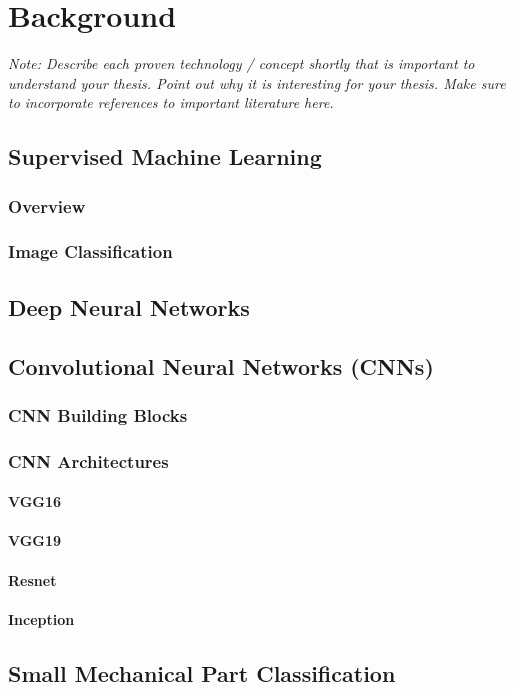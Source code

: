 
\chapter{Background}

\textit{Note: Describe each proven technology / concept shortly that is important to understand your thesis. Point out why it is interesting for your thesis. Make sure to incorporate references to important literature here.}

\section{Supervised Machine Learning}
\subsection{Overview}
\subsection{Image Classification}

\section{Deep Neural Networks}

\section{Convolutional Neural Networks (CNNs)}
\subsection{CNN Building Blocks}
\subsection{CNN Architectures}
\subsubsection{VGG16}
\subsubsection{VGG19}
\subsubsection{Resnet}
\subsubsection{Inception}

\section{Small Mechanical Part Classification}